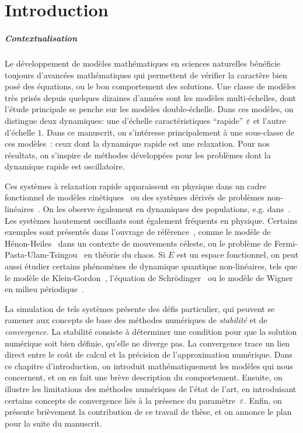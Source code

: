 \chapter*{Introduction}


\paragraph{Contextualisation\\}

Le développement de modèles mathématiques en sciences naturelles bénéficie toujours d'avancées mathématiques qui permettent de vérifier la caractère bien posé des équations, ou le bon comportement des solutions. Une classe de modèles très prisés depuis quelques dizaines d'années sont les modèles multi-échelles, dont l'étude principale se penche sur les modèles double-échelle. Dans ces modèles, on distingue deux dynamiques: une d'échelle caractéristiques \enquote{rapide} $\varepsilon$ et l'autre d'échelle $1$. Dans ce manuscrit, on s'intéresse principalement à une sous-classe de ces modèles~: ceux dont la dynamique rapide est une relaxation. Pour nos résultats, on s'inspire de méthodes développées pour les problèmes dont la dynamique rapide est oscillatoire. 


Ces systèmes à relaxation rapide apparaissent en physique dans un cadre fonctionnel de modèles cinétiques~\cite{bhatnagar.1954.model,lemou.2008.new} ou des systèmes dérivés de problèmes non-linéaires~\cite{jin.1995.relaxation}. On les observe également en dynamiques des populations, e.g. dans~\cite{greiner.1994.singular,auger.1996.emergence,sanchez.2000.singular,castella.2018.analysis}. Les systèmes hautement oscillants sont également fréquents en physique. Certains exemples sont présentés dans l'ouvrage de référence~\cite[Chap.~I]{hairer.2006.geometric}, comme le modèle de Hénon-Heiles~\cite{henon.1964.applicability} dans un contexte de mouvements céleste, ou le problème de Fermi-Pasta-Ulam-Tsingou~\cite{ford.1992.fermi} en théorie du chaos. Si $E$ est un espace fonctionnel, on peut aussi étudier certains phénomènes de dynamique quantique non-linéaires, tels que le modèle de Klein-Gordon~\cite{bao.2012.analysis}, l'équation de Schrödinger~\cite{grebert.2011.energy} ou le modèle de Wigner en milieu périodique~\cite{crouseilles.2017.nonlinear,morandi.2011.wigner}.


La simulation de tels systèmes présente des défis particulier, qui peuvent se ramener aux concepts de base des méthodes numériques de \textit{stabilité} et de \textit{convergence}. La stabilité consiste à déterminer une condition pour que la solution numérique soit bien définie, qu'elle ne diverge pas. La convergence trace un lien direct entre le coût de calcul et la précision de l'approximation numérique. Dans ce chapitre d'introduction, on introduit mathématiquement les modèles qui nous concernent, et on en fait une brève description du comportement. Ensuite, on illustre les limitations des méthodes numériques de l'état de l'art, en introduisant certains concepts de convergence liés à la présence du paramètre~$\varepsilon$. Enfin, on présente brièvement la contribution de ce travail de thèse, et on annonce le plan pour la suite du manuscrit. 


